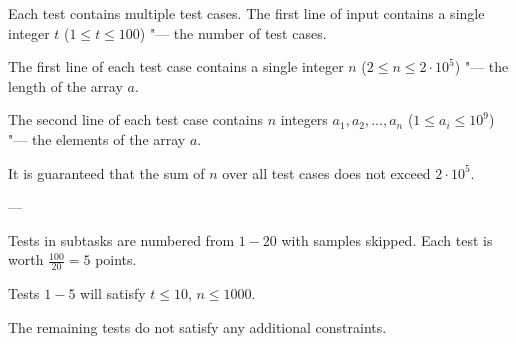Each test contains multiple test cases. The first line of input contains a single integer $t$ ($1 \le t \le 100$) "--- the number of test cases.

The first line of each test case contains a single integer $n$ ($2 \le n \le 2 \cdot 10^5$) "--- the length of the array $a$.

The second line of each test case contains $n$ integers $a_1,a_2, \ldots ,a_n$ ($1 \le a_i \le 10^9$) "--- the elements of the array $a$.

It is guaranteed that the sum of $n$ over all test cases does not exceed $2 \cdot 10^5$.

---

Tests in subtasks are numbered from $1 - 20$ with samples skipped. Each test is worth $\frac{100}{20}=5$ points.


Tests $1 - 5$ will satisfy $t \le 10$, $n \le 1000$.

The remaining tests do not satisfy any additional constraints.
